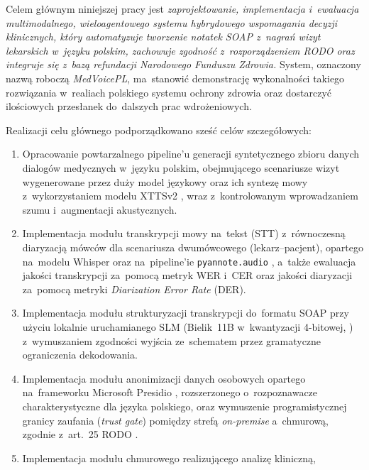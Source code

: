 Celem głównym niniejszej pracy jest \textit{zaprojektowanie,
implementacja i~ewaluacja multimodalnego, wieloagentowego systemu
hybrydowego wspomagania decyzji klinicznych, który automatyzuje
tworzenie notatek SOAP z~nagrań wizyt lekarskich w~języku polskim,
zachowuje zgodność z~rozporządzeniem RODO oraz integruje się z~bazą
refundacji Narodowego Funduszu Zdrowia.} System, oznaczony nazwą
roboczą \emph{MedVoicePL}, ma~stanowić demonstrację wykonalności
takiego rozwiązania w~realiach polskiego systemu ochrony zdrowia
oraz dostarczyć ilościowych przesłanek do~dalszych prac wdrożeniowych.

Realizacji celu głównego podporządkowano sześć celów szczegółowych:

\begin{enumerate}[label=\textbf{C\arabic*.}, leftmargin=*, itemsep=2pt]
  \item Opracowanie powtarzalnego pipeline'u generacji syntetycznego
        zbioru danych dialogów medycznych w~języku polskim, obejmującego
        scenariusze wizyt wygenerowane przez duży model językowy oraz
        ich syntezę mowy z~wykorzystaniem modelu XTTSv2
        \parencite{coqui-tts}, wraz z~kontrolowanym wprowadzaniem szumu
        i~augmentacji akustycznych.
  \item Implementacja modułu transkrypcji mowy na~tekst (STT) z~równoczesną
        diaryzacją mówców dla scenariusza dwumówcowego
        (lekarz–pacjent), opartego na~modelu Whisper
        \parencite{radford2023whisper} oraz na~pipeline'ie
        \texttt{pyannote.audio} \parencite{bredin2023pyannote}, a~także
        ewaluacja jakości transkrypcji za~pomocą metryk WER i~CER
        oraz jakości diaryzacji za~pomocą metryki \emph{Diarization
        Error Rate} (DER).
  \item Implementacja modułu strukturyzacji transkrypcji do~formatu
        SOAP \parencite{weed1968soap} przy użyciu lokalnie uruchamianego
        SLM (Bielik~11B w~kwantyzacji 4-bitowej, \cite{bielik2024})
        z~wymuszaniem zgodności wyjścia ze~schematem przez
        gramatyczne ograniczenia dekodowania.
  \item Implementacja modułu anonimizacji danych osobowych opartego
        na~frameworku Microsoft Presidio \parencite{presidio-docs},
        rozszerzonego o~rozpoznawacze charakterystyczne dla języka
        polskiego, oraz wymuszenie programistycznej granicy zaufania
        (\emph{trust gate}) pomiędzy strefą \emph{on-premise}
        a~chmurową, zgodnie z~art.~25 RODO \parencite{gdpr2016}.
  \item Implementacja modułu chmurowego realizującego analizę kliniczną,

\end{enumerate}

